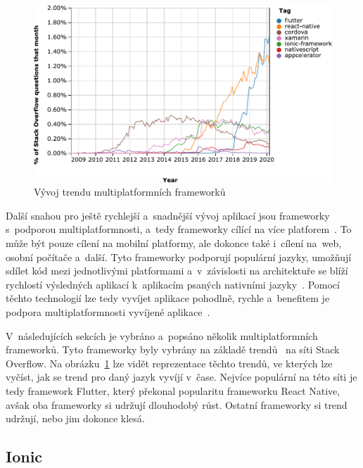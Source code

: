 \begin{figure}
    \centering
    \includegraphics[width=\linewidth]{assets/technology-research/framework/popularity.pdf}
    \caption{Vývoj trendu multiplatformních
    frameworků~\cite{framework_popularity}}
    \label{fig:framework_popularity}
\end{figure}

Další snahou pro ještě rychlejší a~snadnější vývoj aplikací jsou frameworky
s~podporou multiplatformnosti,
a~tedy frameworky cílící na více platforem~\cite{hackernoon_flutter}.
To může být pouze cílení na mobilní platformy,
ale dokonce také i~cílení na~web, osobní počítače a~další.
Tyto frameworky podporují populární jazyky,
umožňují sdílet kód mezi jednotlivými platformami
a~v~závislosti na architektuře se blíží rychlostí výsledných aplikací
k~aplikacím psaných nativními jazyky~\cite{hackernoon_flutter}.
Pomocí těchto technologií lze tedy vyvíjet aplikace pohodlně, rychle
a~benefitem  je podpora multiplatformnosti vyvíjené
aplikace~\cite{dashmagazine_mobile_frameworks}.

V~následujících sekcích je vybráno a~popsáno několik multiplatformních
frameworků.
Tyto frameworky byly vybrány na základě trendů~\cite{framework_popularity}
na síti Stack Overflow.
Na obrázku~\ref{fig:framework_popularity} lze vidět reprezentace těchto trendů,
ve kterých lze vyčíst,
jak se trend pro daný jazyk vyvíjí v~čase.
Nejvíce populární na této síti je tedy framework Flutter,
který překonal popularitu frameworku React Native,
avšak oba frameworky si udržují dlouhodobý růst.
Ostatní frameworky si trend udržují,
nebo jim dokonce klesá.

\subsection{Ionic}

